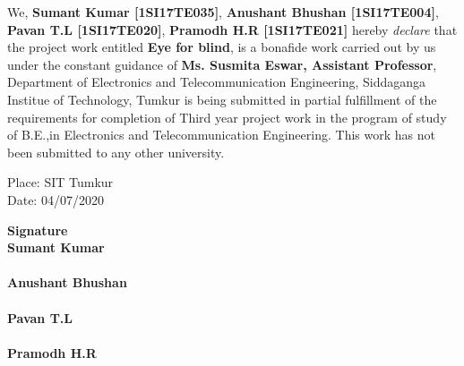\declaration
\vspace*{1cm}

\noindent We, \textbf{Sumant Kumar [1SI17TE035]}, \textbf{Anushant Bhushan [1SI17TE004]}, \textbf{Pavan T.L [1SI17TE020]}, \textbf{Pramodh H.R [1SI17TE021]} hereby \textit{declare} that the project work entitled \textbf{Eye for blind}, is a bonafide work carried out by us under the constant guidance of \textbf{Ms. Susmita Eswar, Assistant Professor}, Department of Electronics and Telecommunication Engineering, Siddaganga Institue of Technology, Tumkur is being submitted in partial fulfillment of the requirements for completion of Third year project work in the program of study of B.E.,in Electronics and Telecommunication Engineering. This work has not been submitted to any other university. 


\begin{singlespacing}
\noindent Place: SIT Tumkur \\
\noindent Date: 04/07/2020
\begin{flushleft}
\hspace{7cm}{\bf Name of Students}\hspace{2cm} \bf Signature \\
 \vspace{0.5cm}
 \hspace{7cm}Sumant Kumar\\\\
 \vspace{0.5cm}
 \hspace{7cm}Anushant Bhushan\\\\
\vspace{0.5cm}
 \hspace{7cm}Pavan T.L\\\\
 \vspace{0.5cm}
 \hspace{7cm}Pramodh H.R
\end{flushleft}


\end{singlespacing}